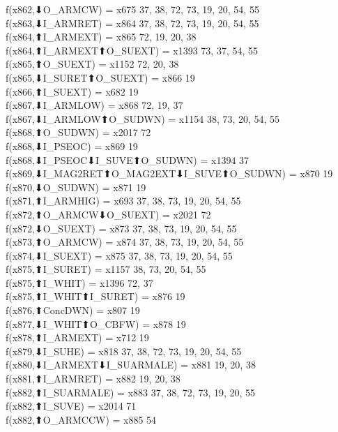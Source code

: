 f(x862,⬇O_ARMCW) = x675 {37, 38, 72, 73, 19, 20, 54, 55} \\
f(x863,⬇I_ARMRET) = x864 {37, 38, 72, 73, 19, 20, 54, 55} \\
f(x864,⬆I_ARMEXT) = x865 {72, 19, 20, 38} \\
f(x864,⬆I_ARMEXT⬆O_SUEXT) = x1393 {73, 37, 54, 55} \\
f(x865,⬆O_SUEXT) = x1152 {72, 20, 38} \\
f(x865,⬇I_SURET⬆O_SUEXT) = x866 {19} \\
f(x866,⬆I_SUEXT) = x682 {19} \\
f(x867,⬇I_ARMLOW) = x868 {72, 19, 37} \\
f(x867,⬇I_ARMLOW⬆O_SUDWN) = x1154 {38, 73, 20, 54, 55} \\
f(x868,⬆O_SUDWN) = x2017 {72} \\
f(x868,⬇I_PSEOC) = x869 {19} \\
f(x868,⬇I_PSEOC⬇I_SUVE⬆O_SUDWN) = x1394 {37} \\
f(x869,⬇I_MAG2RET⬆O_MAG2EXT⬇I_SUVE⬆O_SUDWN) = x870 {19} \\
f(x870,⬇O_SUDWN) = x871 {19} \\
f(x871,⬆I_ARMHIG) = x693 {37, 38, 73, 19, 20, 54, 55} \\
f(x872,⬆O_ARMCW⬇O_SUEXT) = x2021 {72} \\
f(x872,⬇O_SUEXT) = x873 {37, 38, 73, 19, 20, 54, 55} \\
f(x873,⬆O_ARMCW) = x874 {37, 38, 73, 19, 20, 54, 55} \\
f(x874,⬇I_SUEXT) = x875 {37, 38, 73, 19, 20, 54, 55} \\
f(x875,⬆I_SURET) = x1157 {38, 73, 20, 54, 55} \\
f(x875,⬆I_WHIT) = x1396 {72, 37} \\
f(x875,⬆I_WHIT⬆I_SURET) = x876 {19} \\
f(x876,⬆ConcDWN) = x807 {19} \\
f(x877,⬇I_WHIT⬆O_CBFW) = x878 {19} \\
f(x878,⬆I_ARMEXT) = x712 {19} \\
f(x879,⬇I_SUHE) = x818 {37, 38, 72, 73, 19, 20, 54, 55} \\
f(x880,⬇I_ARMEXT⬇I_SUARMALE) = x881 {19, 20, 38} \\
f(x881,⬆I_ARMRET) = x882 {19, 20, 38} \\
f(x882,⬆I_SUARMALE) = x883 {37, 38, 72, 73, 19, 20, 55} \\
f(x882,⬆I_SUVE) = x2014 {71} \\
f(x882,⬆O_ARMCCW) = x885 {54} \\
